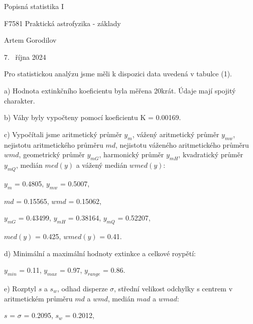 \documentclass[a4paper,11pt]{article}
\begin{document}
\hline
\begin{center}
\bigskip
\huge Popisná statistika I
\vspace{0.5cm}
\par \large F7581 Praktická astrofyzika - základy
\par \large Artem Gorodilov
\vspace{0.5cm}
\par \large 7. ~října 2024
\bigskip
\end{center}
\hline
\bigskip


\vskip10pt
    \begin{minipage}[t]{0.5\textwidth} 
        Pro statistickou analýzu jsme měli k dispozici data uvedená v tabulce (1).
        \par a) Hodnota extinkčního koeficientu byla měřena 20krát. Údaje mají spojitý charakter. 
        \par b) Váhy byly vypočteny pomocí koeficientu K = 0.00169.
        \par c) Vypočítali jsme aritmetický průměr $y_m$, vážený aritmetický průměr $y_{mw}$, nejistotu aritmetického průměru $md$, nejistotu váženého aritmetického průměru $wmd$, geometrický průměr $y_{mG}$, harmonický průměr $y_{mH}$, kvadratický průměr $y_{mQ}$, medián $med(y)$ a vážený medián $wmed(y)$:
        \begin{center}
            $y_m$ = 0.4805, $y_{mw}$ = 0.5007,
            \vspace{5pt}
            \par $md$ = 0.15565, $wmd$ = 0.15062,
            \vspace{5pt}
            \par $y_{mG}$ = 0.43499, $y_{mH}$ = 0.38164, $y_{mQ}$ = 0.52207,
            \vspace{5pt}
            \par $med(y)$ = 0.425, $wmed(y)$ = 0.41.
        \end{center}
        \par d) Minimální a maximální hodnoty extinkce a celkové roypětí:
        \begin{center}
            $y_{min}$ = 0.11, $y_{max}$ = 0.97, $y_{range}$ = 0.86.
        \end{center}
        \par e) Rozptyl $s$ a $s_w$, odhad disperze $\sigma$, střední velikost odchylky s centrem v aritmetickém průměru $md$ a $wmd$, medián $mad$ a $wmad$:
        \begin{center}
            $s$ = $\sigma$ = 0.2095, $s_w$ = 0.2012,

\end{center}
\end{minipage}
\end{document}
